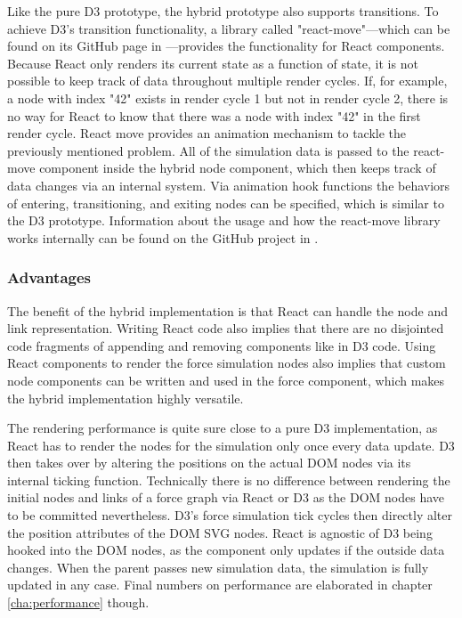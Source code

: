 Like the pure D3 prototype, the hybrid prototype also supports transitions. To achieve D3's transition functionality, a library called "react-move"---which can be found on its GitHub page in \cite{ReactMove}---provides the functionality for React components. Because React only renders its current state as a function of state, it is not possible to keep track of data throughout multiple render cycles. If, for example, a node with index "42" exists in render cycle 1 but not in render cycle 2, there is no way for React to know that there was a node with index "42" in the first render cycle. React move provides an animation mechanism to tackle the previously mentioned problem. All of the simulation data is passed to the react-move component inside the hybrid node component, which then keeps track of data changes via an internal system. Via animation hook functions the behaviors of entering, transitioning, and exiting nodes can be specified, which is similar to the D3 prototype. Information about the usage and how the react-move library works internally can be found on the GitHub project in \cite{ReactMove}.


\subsubsection{Advantages}

The benefit of the hybrid implementation is that React can handle the node and link representation. Writing React code also implies that there are no disjointed code fragments of appending and removing components like in D3 code. Using React components to render the force simulation nodes also implies that custom node components can be written and used in the force component, which makes the hybrid implementation highly versatile.

The rendering performance is quite sure close to a pure D3 implementation, as React has to render the nodes for the simulation only once every data update. D3 then takes over by altering the positions on the actual DOM nodes via its internal ticking function. Technically there is no difference between rendering the initial nodes and links of a force graph via React or D3 as the DOM nodes have to be committed nevertheless. D3's force simulation tick cycles then directly alter the position attributes of the DOM SVG nodes. React is agnostic of D3 being hooked into the DOM nodes, as the component only updates if the outside data changes. When the parent passes new simulation data, the simulation is fully updated in any case. Final numbers on performance are elaborated in chapter \ref{cha:performance} though.

